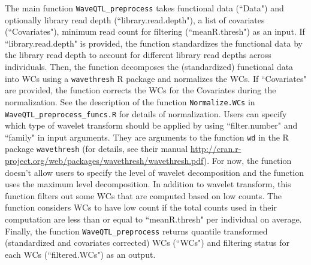 \documentclass[11pt]{article}
\begin{document}
The main function {\tt WaveQTL\_preprocess} takes functional data (``Data") and optionally library read depth (``library.read.depth"), a list of covariates (``Covariates"), minimum read count for filtering (``meanR.thresh") as an input. If ``library.read.depth" is provided, the function standardizes the functional data by the library read depth to account for different library read depths across individuals. Then, the function decomposes the (standardized) functional data into WCs using a {\tt wavethresh} R package and normalizes the WCs. If ``Covariates" are provided, the function corrects the WCs for the Covariates during the normalization. See the description of the function {\tt Normalize.WCs} in {\tt WaveQTL\_preprocess\_funcs.R} for details of normalization. Users can specify which type of wavelet transform should be applied by using ``filter.number" and ``family" in input arguments. They are arguments to the function {\tt wd} in the R package {\tt wavethresh} (for details, see their manual \url{http://cran.r-project.org/web/packages/wavethresh/wavethresh.pdf}). For now, the function doesn't allow users to specify the level of wavelet decomposition and the function uses the maximum level decomposition. In addition to wavelet transform, this function filters out some WCs that are computed based on low counts. The function considers WCs to have low count if the total counts used in their computation are less than or equal to ``meanR.thresh" per individual on average. Finally, the function {\tt WaveQTL\_preprocess} returns quantile transformed (standardized and covariates corrected) WCs (``WCs") and filtering status for each WCs (``filtered.WCs") as an output.
\end{document}
